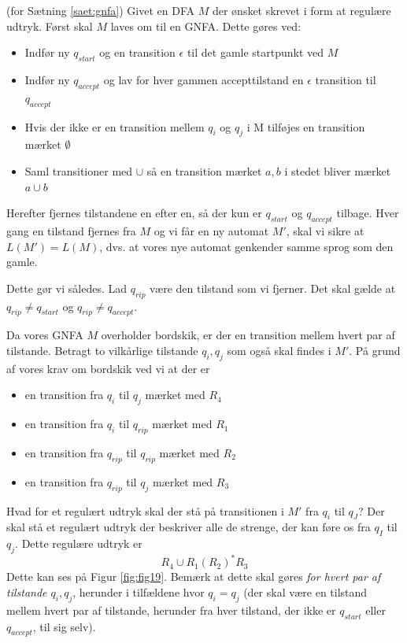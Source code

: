 \documentclass[a4paper,10pt,article]{memoir}
\begin{document}
\begin{bevis}(for Sætning \ref{saet:gnfa})
Givet en DFA $M$ der ønsket skrevet i form at regulære udtryk.
Først skal $M$ laves om til en GNFA.
Dette gøres ved:
\begin{itemize}
\item Indfør ny $q_{start}$ og en transition $\epsilon$ til det gamle startpunkt ved $M$
\item Indfør ny $q_{accept}$ og lav for hver gammen accepttilstand en $\epsilon$ transition til $q_{accept}$
\item Hvis der ikke er en transition mellem $q_i$ og $q_j$ i M tilføjes en transition mærket $\emptyset$
\item Saml transitioner med $\cup$ så en transition mærket $a,b$ i stedet bliver mærket $a\cup b$
\end{itemize}

Herefter fjernes tilstandene en efter en, så der kun er $q_{start}$ og
$q_{accept}$ tilbage.  Hver gang en tilstand fjernes fra $M$ og vi får
en ny automat $M'$, skal vi sikre at $L(M') = L(M)$, dvs. at vores nye
automat genkender samme sprog som den gamle.

Dette gør vi således. Lad $q_{rip}$ være den tilstand som vi
fjerner. Det skal gælde at $q_{rip} \neq q_{start}$ og $q_{rip} \neq
q_{accept}$. 

Da vores GNFA $M$ overholder bordskik, er der en transition mellem
hvert par af tilstande. Betragt to vilkårlige tilstande
$q_i,q_j$ som også skal findes i $M'$. På grund af vores krav om
bordskik ved vi at der er
%
\begin{itemize}
\item en transition fra $q_i$ til $q_j$ mærket med $R_4$
\item en transition fra $q_i$ til $q_{rip}$ mærket med $R_1$
\item en transition fra $q_{rip}$ til $q_{rip}$ mærket med $R_2$
\item en transition fra $q_{rip}$ til $q_j$ mærket med $R_3$
\end{itemize}
%
Hvad for et regulært udtryk skal der stå på transitionen i $M'$ fra
$q_i$ til $q_J$? Der skal stå et regulært udtryk der beskriver alle de
strenge, der kan føre os fra $q_I$ til $q_j$. Dette regulære udtryk er
%
\[  R_4 \cup R_1(R_2)^* R_3 \]
%
Dette kan ses på Figur \ref{fig:fig19}. Bemærk at dette skal gøres
\emph{for hvert par af tilstande $q_i,q_j$}, herunder i tilfældene
hvor $q_i = q_j$ (der skal være en tilstand mellem hvert par af
tilstande, herunder fra hver tilstand, der ikke er $q_{start}$ eller
$q_{accept}$, til sig selv).


\end{bevis}
\end{document}
